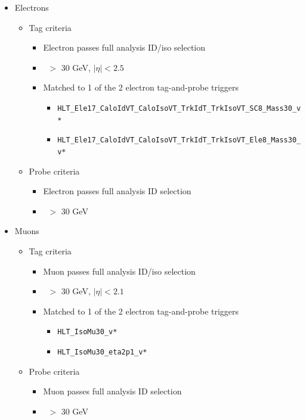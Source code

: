 

\begin{itemize}
  \item{Electrons}

    \begin{itemize}
    \item{Tag criteria}

      \begin{itemize}
      \item Electron passes full analysis ID/iso selection 
      \item \pt\ $>$ 30 GeV, $|\eta|<2.5$
 
      \item Matched to 1 of the 2 electron tag-and-probe triggers
        \begin{itemize}
        \item \verb=HLT_Ele17_CaloIdVT_CaloIsoVT_TrkIdT_TrkIsoVT_SC8_Mass30_v*=
        \item \verb=HLT_Ele17_CaloIdVT_CaloIsoVT_TrkIdT_TrkIsoVT_Ele8_Mass30_v*=
        \end{itemize}
      \end{itemize}

    \item{Probe criteria}
      \begin{itemize}
      \item Electron passes full analysis ID selection
      \item \pt\ $>$ 30 GeV
      \end{itemize}
      \end{itemize}
  \item{Muons}
    \begin{itemize}
    \item{Tag criteria}
      \begin{itemize}
      \item Muon passes full analysis ID/iso selection
      \item \pt\ $>$ 30 GeV, $|\eta|<2.1$
      \item Matched to 1 of the 2 electron tag-and-probe triggers
        \begin{itemize}
        \item \verb=HLT_IsoMu30_v*=
        \item \verb=HLT_IsoMu30_eta2p1_v*=
        \end{itemize}
      \end{itemize}
    \item{Probe criteria}
      \begin{itemize}
      \item Muon passes full analysis ID selection
      \item \pt\ $>$ 30 GeV
      \end{itemize}
    \end{itemize}
\end{itemize}

